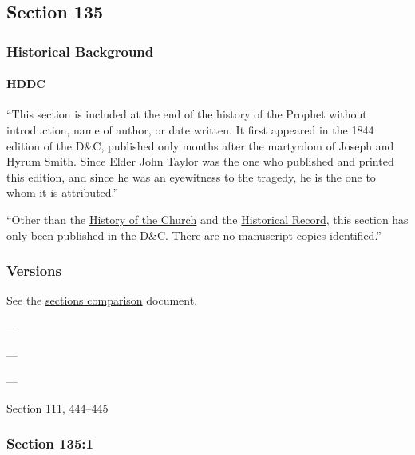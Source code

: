 \subsection{Section 135}
	\label{DC135}
	
	\subsubsection{Historical Background}
		\label{DC135-HB}
		
		\paragraph{HDDC}
		
			``This section is included at the end of the history of the Prophet without introduction, name of author, or date written. It first appeared in the 1844 edition of the D\&C, published only months after the martyrdom of Joseph and Hyrum Smith. Since Elder John Taylor was the one who published and printed this edition, and since he was an eyewitness to the tragedy, he is the one to whom it is attributed.''
			
			``Other than the \uline{History of the Church} and the \uline{Historical Record}, this section has only been published in the D\&C. There are no manuscript copies identified.''

	\subsubsection{Versions}
		\label{DC135-V}
		
		See the \href{https://drive.google.com/file/d/1goAvNz8jS4R8slYfMG_db55Ty2z_vmgK/view?usp=sharing}{sections comparison} document.
	
		\begin{compactdesc}
			\item[JSP] ---
			\item[BC] ---
			\item[DC 1835] ---
			\item[DC 1844] Section 111, 444--445
		\end{compactdesc}

	\subsubsection{Section 135:1} %
		\label{DC135-1}

